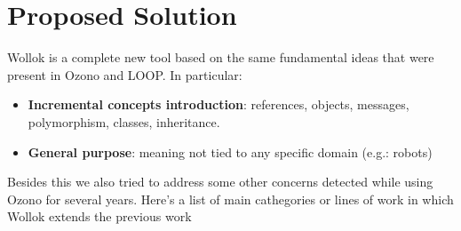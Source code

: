 \section{Proposed Solution}
\label{sec:proposedSolution}


Wollok is a complete new tool based on the same fundamental ideas that were present in Ozono and LOOP. In particular:

\begin{itemize}
\item \textbf{Incremental concepts introduction}: references, objects, messages, polymorphism, classes, inheritance.
\item \textbf{General purpose}: meaning not tied to any specific domain (e.g.: robots)
\end{itemize}

Besides this we also tried to address some other concerns detected while using Ozono for several years. Here's a list of main cathegories or lines of work in which Wollok extends the previous work

